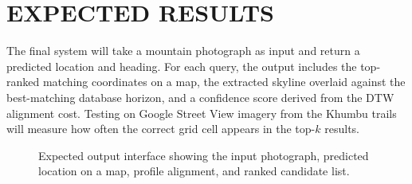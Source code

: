 \chapter{EXPECTED RESULTS}
The final system will take a mountain photograph as input and return a predicted location and heading. For each query, the output includes the top-ranked matching coordinates on a map, the extracted skyline overlaid against the best-matching database horizon, and a confidence score derived from the DTW alignment cost. Testing on Google Street View imagery from the Khumbu trails \cite{google2015streetview} will measure how often the correct grid cell appears in the top-$k$ results.

\begin{figure}[htbp]
    \centering
    \resizebox{\textwidth}{!}{}
    \caption{Expected output interface showing the input photograph, predicted location on a map, profile alignment, and ranked candidate list.}
    \label{fig:expected_output}
\end{figure}
